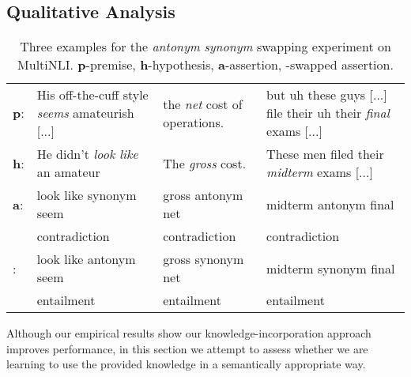 \documentclass[11pt,a4paper]{article}
\begin{document}
\subsection{Qualitative Analysis}
\label{sec:analysis}

\begin{table*}[t]
    \small
    \centering
    \begin{tabular}{l p{} p{2.6cm} p{5.4cm} }
         \toprule
         
         \textbf{p}: &
         His off-the-cuff style \textit{seems} amateurish [...] & 
         the \textit{net} cost of operations. & 
         but uh these guys [...] file their uh their \textit{final} exams [...] \\
         
         \textbf{h}: &
         He didn't \textit{look like} an amateur &
         The \textit{gross} cost. &
         These men filed their \textit{midterm} exams [...] \\
         \midrule
         
         \textbf{a}: &
         look like synonym seem &
         gross antonym net &
         midterm antonym final \\
         
          &
         contradiction &
         contradiction &
         contradiction \\
         \midrule
         
         : &
         look like antonym seem &
         gross synonym net &
         midterm synonym final \\
         
          &
         entailment &
         entailment &
         entailment \\
         \bottomrule
    \end{tabular}
    \caption{Three examples for the \textit{antonym}  \textit{synonym} swapping experiment on MultiNLI. \textbf{p}-premise, \textbf{h}-hypothesis, \textbf{a}-assertion, -swapped assertion.}
    \label{tab:examples}
\end{table*}

Although our empirical results show our knowledge-incorporation approach improves performance, in this section we attempt to assess whether we are learning to use the provided knowledge in a semantically appropriate way.
\end{document}
